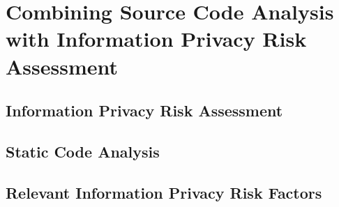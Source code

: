 \section{Combining Source Code Analysis with Information Privacy Risk Assessment}

\subsection{Information Privacy Risk Assessment}

\subsection{Static Code Analysis}

\subsection{Relevant Information Privacy Risk Factors}